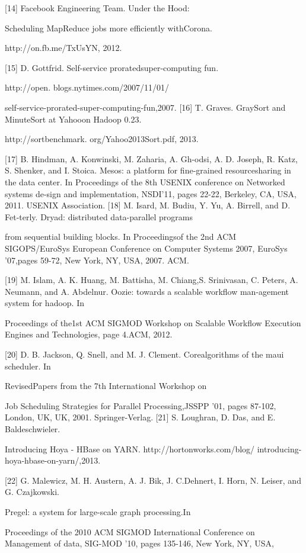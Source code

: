 [14] Facebook Engineering Team. Under the Hood:

Scheduling MapReduce jobs more efficiently withCorona.

http://on.fb.me/TxUsYN, 2012.

[15] D. Gottfrid. Self-service proratedsuper-computing fun.

http://open.
blogs.nytimes.com/2007/11/01/

self-service-prorated-super-computing-fun,2007.
[16] T. Graves. GraySort and MinuteSort at Yahooon Hadoop 0.23.

http://sortbenchmark.
org/Yahoo2013Sort.pdf, 2013.

[17] B. Hindman, A. Konwinski, M. Zaharia, A. Gh-odsi, A. D. Joseph, R. Katz, S. Shenker, and I. Stoica. Mesos: a platform for fine-grained resourcesharing in the data center. In Proceedings of the
8th USENIX conference on Networked systems de-sign and implementation, NSDI'11, pages 22-22,
Berkeley, CA, USA, 2011. USENIX Association.
[18] M. Isard, M. Budiu, Y. Yu, A. Birrell, and D. Fet-terly. Dryad: distributed data-parallel programs

from sequential building blocks. In Proceedingsof the 2nd ACM SIGOPS/EuroSys European Conference on Computer Systems 2007, EuroSys '07,pages 59-72, New York, NY, USA, 2007. ACM.

[19] M. Islam, A. K. Huang, M. Battisha, M. Chiang,S. Srinivasan, C. Peters, A. Neumann, and A. Abdelnur. Oozie: towards a scalable workflow man-agement system for hadoop. In

Proceedings of the1st ACM SIGMOD Workshop on Scalable Workflow Execution Engines and Technologies, page 4.ACM, 2012.

[20] D. B. Jackson, Q. Snell, and M. J. Clement. Corealgorithms of the maui scheduler. In

RevisedPapers from the 7th International Workshop on

Job Scheduling Strategies for Parallel Processing,JSSPP '01, pages 87-102, London, UK, UK, 2001.
Springer-Verlag.
[21] S. Loughran, D. Das, and E. Baldeschwieler.

Introducing Hoya - HBase on YARN.
http://hortonworks.com/blog/
introducing-hoya-hbase-on-yarn/,2013.

[22] G. Malewicz, M. H. Austern, A. J. Bik, J. C.Dehnert, I. Horn, N. Leiser, and G. Czajkowski.

Pregel: a system for large-scale graph processing.In

Proceedings of the 2010 ACM SIGMOD International Conference on Management of data, SIG-MOD '10, pages 135-146, New York, NY, USA,

